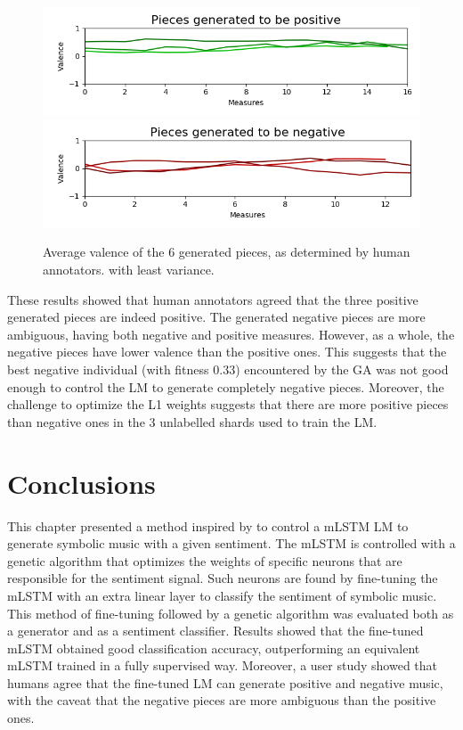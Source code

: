 \begin{figure}[!h]
 \includegraphics[width=0.9\columnwidth]{imgs/ismir19/means_pos.png}
 \includegraphics[width=0.9\columnwidth]{imgs/ismir19/means_neg.png}
 \caption{Average valence of the 6 generated pieces, as determined by human annotators.
 with least variance.}
 \label{fig:generated_eval}
\end{figure}

These results showed that human annotators agreed that the three positive generated pieces are indeed positive. The generated negative pieces are more ambiguous, having both negative and positive measures. However, as a whole, the negative pieces have lower valence than the positive ones. This suggests that the best negative individual (with fitness $0.33$) encountered by the GA was not good enough to control the LM to generate completely negative pieces. Moreover, the challenge to optimize the L1 weights suggests that there are more positive pieces than negative ones in the 3 unlabelled shards used to train the LM.

\section{Conclusions}

This chapter presented a method inspired by \citet{radford_2017} to control a mLSTM LM to generate symbolic music with a given sentiment. The mLSTM is controlled with a genetic algorithm that optimizes the weights of specific neurons that are responsible for the sentiment signal. Such neurons are found by fine-tuning the mLSTM with an extra linear layer to classify the sentiment of symbolic music. This method of fine-tuning followed by a genetic algorithm was evaluated both as a generator and as a sentiment classifier. Results showed that the fine-tuned mLSTM obtained good classification accuracy, outperforming an equivalent mLSTM trained in a fully supervised way. Moreover, a user study showed that humans agree that the fine-tuned LM can generate positive and negative music, with the caveat that the negative pieces are more ambiguous than the positive ones.

